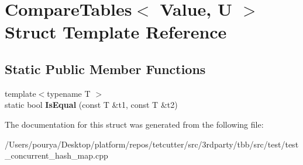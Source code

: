 \hypertarget{structCompareTables}{}\section{Compare\+Tables$<$ Value, U $>$ Struct Template Reference}
\label{structCompareTables}
\subsection*{Static Public Member Functions}
\begin{DoxyCompactItemize}
\item 
\hypertarget{structCompareTables_a7eec3ac2bc3b09ef42959d0269bb08b8}{}{\footnotesize template$<$typename T $>$ }\\static bool {\bfseries Is\+Equal} (const T \&t1, const T \&t2)\label{structCompareTables_a7eec3ac2bc3b09ef42959d0269bb08b8}

\end{DoxyCompactItemize}


The documentation for this struct was generated from the following file\+:\begin{DoxyCompactItemize}
\item 
/\+Users/pourya/\+Desktop/platform/repos/tetcutter/src/3rdparty/tbb/src/test/test\+\_\+concurrent\+\_\+hash\+\_\+map.\+cpp\end{DoxyCompactItemize}
